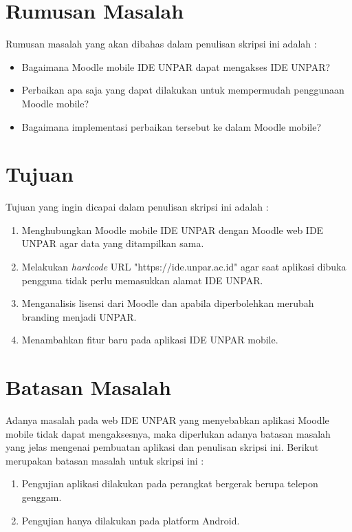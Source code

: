 \section{Rumusan Masalah}
\label{sec:rumusan}
Rumusan masalah yang akan dibahas dalam penulisan skripsi ini adalah :
\begin{itemize}
	\item Bagaimana Moodle mobile IDE UNPAR dapat mengakses IDE UNPAR?
	\item Perbaikan apa saja yang dapat dilakukan untuk mempermudah penggunaan Moodle mobile?
	\item Bagaimana implementasi perbaikan tersebut ke dalam Moodle mobile?
\end{itemize}

\section{Tujuan}
\label{sec:tujuan}
Tujuan yang ingin dicapai dalam penulisan skripsi ini adalah :
\begin{enumerate}
	\item Menghubungkan Moodle mobile IDE UNPAR dengan Moodle web IDE UNPAR agar data yang ditampilkan sama.
	\item Melakukan \textit{hardcode} URL "https://ide.unpar.ac.id" agar saat aplikasi dibuka pengguna tidak perlu memasukkan alamat IDE UNPAR.
	\item Menganalisis lisensi dari Moodle dan apabila diperbolehkan merubah branding menjadi UNPAR.
	\item Menambahkan fitur baru pada aplikasi IDE UNPAR mobile.
\end{enumerate}

\section{Batasan Masalah}
\label{sec:batasan}
Adanya masalah pada web IDE UNPAR yang menyebabkan aplikasi Moodle mobile tidak dapat mengaksesnya, maka diperlukan adanya batasan masalah yang jelas mengenai pembuatan aplikasi dan penulisan skripsi ini. Berikut merupakan batasan masalah untuk skripsi ini :
\begin{enumerate}
	\item Pengujian aplikasi dilakukan pada perangkat bergerak berupa telepon genggam.
	\item Pengujian hanya dilakukan pada platform Android.
\end{enumerate}

